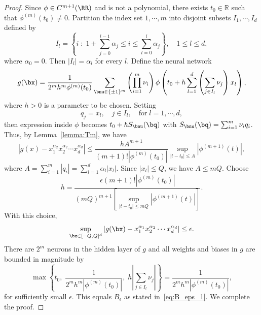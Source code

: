 \documentclass[11pt]{article}
\begin{document}
\begin{proof}
    Since $\phi \in C^{m+1}(\RR)$ and is not a polynomial, there exists $t_0 \in \mathbb{R}$ such that $\phi^{(m)}(t_0) \neq 0$. Partition the index set ${1, \cdots, m}$ into disjoint subsets $I_1, \cdots, I_d$ defined by
   \begin{equation*}
       I_l = \left\{ i \;:\; 1+ \sum_{j=0}^{l-1}  \alpha_j \leq i \leq \sum_{l=0}^l \alpha_j \right\}, \quad 1 \leq l \leq d,
   \end{equation*}
   where  $\alpha_0 = 0$. Then $|I_l| = \alpha_l$ for every $l$. Define the neural network 
   \begin{equation*}
       g(\bx) = \frac{1}{2^m h^m \phi^{(m)}(t_0)} \sum_{\bnu \in \{\pm 1\}^m } \left( \prod_{i=1}^m \nu_i\right) \phi \left( t_0 + h \sum_{l=1}^d \left(\sum_{j \in I_l}  \nu_j \right) x_l  \right),
   \end{equation*}
   where $h>0$ is a parameter to be chosen. Setting
   \begin{equation*}
       q_j = x_l,  \quad j \in I_l , \quad \mathrm{for} \; l =1, \cdots, d,
   \end{equation*}
    then expression inside $\phi$ becomes $t_0 + h S_{\bnu}(\bq)$ with $S_{\bnu}(\bq) = \sum_{i=1}^m \nu_i q_i$. Thus,  by Lemma~\ref{lemma:Tm}, we have 
   \begin{equation*}
       |g(x) - x_1^{\alpha_2} x_2^{\alpha_2} \cdots x_d^{\alpha_d}| \leq \frac{h A^{m+1}}{ (m+1)!|\phi^{(m)}(t_0)|} \sup_{|t-t_0| \leq A} \left| \phi^{(m+1)}(t)\right|,
   \end{equation*}
   where $A = \sum_{i=1}^m |q_i| = \sum_{l=1}^d \alpha_l |x_l|$. Since $|x_l| \leq Q$, we have $A \leq mQ$. Choose
   \begin{equation*}
       h = \frac{\epsilon (m+1)! |\phi^{(m)}(t_0)| }{(mQ)^{m+1} [\sup_{|t-t_0| \leq mQ}|\phi^{(m+1)}(t)|]}. 
   \end{equation*}
   With this choice,
   \begin{equation*}
      \sup_{\bx \in [-Q,Q]^d} |g(\bx) - x_1^{\alpha_1} x_2^{\alpha_2} \cdots x_d^{\alpha_d} | \leq \epsilon.
   \end{equation*}
   There are $2^m$ neurons in the hidden layer of $g$ and all weights and biases in $g$ are bounded in magnitude by
   \begin{equation*}
       \max \left\{t_0,\; \frac{1}{2^m h^m |\phi^{(m)}(t_0)|},\; h \left| \sum_{j \in I_l} \nu _j \right|\right\} = \frac{1}{2^m h^m | \phi^{(m)}(t_0)|},
   \end{equation*}
   for sufficiently small $\epsilon$. This equals $B_{\epsilon}$ as stated in~\eqref{eq:B_eps_1}. We complete the proof.
\end{proof}
\end{document}
